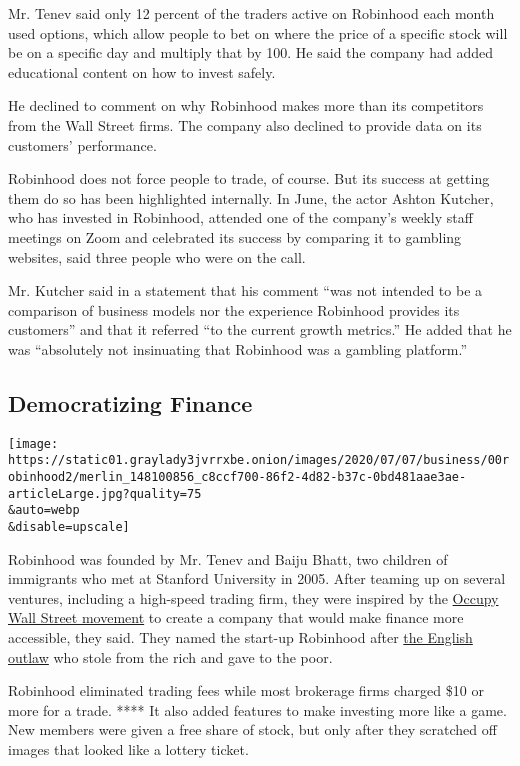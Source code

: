 Mr. Tenev said only 12 percent of the traders active on Robinhood each
month used options, which allow people to bet on where the price of a
specific stock will be on a specific day and multiply that by 100. He
said the company had added educational content on how to invest safely.

He declined to comment on why Robinhood makes more than its competitors
from the Wall Street firms. The company also declined to provide data on
its customers' performance.

Robinhood does not force people to trade, of course. But its success at
getting them do so has been highlighted internally. In June, the actor
Ashton Kutcher, who has invested in Robinhood, attended one of the
company's weekly staff meetings on Zoom and celebrated its success by
comparing it to gambling websites, said three people who were on the
call.

Mr. Kutcher said in a statement that his comment ``was not intended to
be a comparison of business models nor the experience Robinhood provides
its customers'' and that it referred ``to the current growth metrics.''
He added that he was ``absolutely not insinuating that Robinhood was a
gambling platform.''

\hypertarget{democratizing-finance}{%
\subsection{Democratizing Finance}\label{democratizing-finance}}

\texttt{[image: https://static01.graylady3jvrrxbe.onion/images/2020/07/07/business/00robinhood2/merlin\_148100856\_c8ccf700-86f2-4d82-b37c-0bd481aae3ae-articleLarge.jpg?quality=75\\\&auto=webp\\\&disable=upscale]}

Robinhood was founded by Mr. Tenev and Baiju Bhatt, two children of
immigrants who met at Stanford University in 2005. After teaming up on
several ventures, including a high-speed trading firm, they were
inspired by the
\href{https://www.nytimes3xbfgragh.onion/topic/organization/occupy-movement-occupy-wall-street}{Occupy
Wall Street movement} to create a company that would make finance more
accessible, they said. They named the start-up Robinhood after
\href{https://en.wikipedia.org/wiki/Robin_Hood}{the English outlaw} who
stole from the rich and gave to the poor.

Robinhood eliminated trading fees while most brokerage firms charged
\$10 or more for a trade. **** It also added features to make investing
more like a game. New members were given a free share of stock, but only
after they scratched off images that looked like a lottery ticket.

